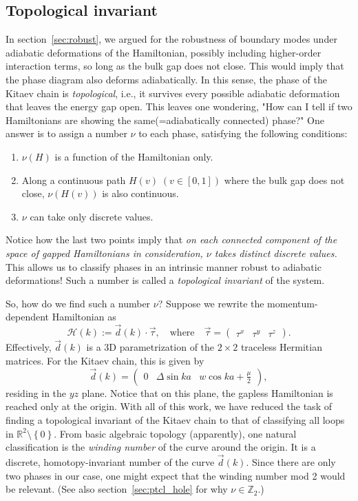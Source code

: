 \documentclass{article}
\begin{document}
\subsection{Topological invariant}\label{sec:invar}
In section~\ref{sec:robust}, we argued for the robustness of boundary modes under adiabatic deformations
of the Hamiltonian, possibly including higher-order interaction terms,
so long as the bulk gap does not close.
This would imply that the phase diagram also deforms adiabatically.
In this sense, the phase of the Kitaev chain is \emph{topological}, i.e., it survives
every possible adiabatic deformation that leaves the energy gap open.
This leaves one wondering,
"How can I tell if two Hamiltonians are showing the same(=adiabatically connected) phase?"
One answer is to assign a number $\nu$ to each phase, satisfying the following conditions:
\begin{enumerate}
    \item $\nu(H)$ is a function of the Hamiltonian only.
    \item Along a continuous path $H(v)\; (v\in[0,1])$ where the bulk gap does not close,
        $\nu(H(v))$ is also continuous.
    \item $\nu$ can take only discrete values.
\end{enumerate}
Notice how the last two points imply that \emph{on each connected component
of the space of gapped Hamiltonians in consideration,
$\nu$ takes distinct discrete values.}
This allows us to classify phases in an intrinsic manner robust to adiabatic deformations!
Such a number is called a \emph{topological invariant} of the system.

So, how do we find such a number $\nu$?
Suppose we rewrite the momentum-dependent Hamiltonian as
\[
    \mathcal{H}(k) := \vec{d}(k) \cdot \vec{\tau},\quad \text{where}\quad
    \vec{\tau} = \begin{pmatrix}
        \tau^x & \tau^y & \tau^z
    \end{pmatrix}.
\]
Effectively, $\vec{d}(k)$ is a 3D parametrization of the $2\times2$ traceless Hermitian matrices.
For the Kitaev chain, this is given by
\[
    \vec{d}(k) = \begin{pmatrix}
        0 & \Delta\sin ka & w\cos ka + \frac{\mu}{2}
    \end{pmatrix},
\]
residing in the $yz$ plane.
Notice that on this plane, the gapless Hamiltonian is reached only at the origin.
With all of this work, we have reduced the task of finding a topological invariant of the Kitaev chain
to that of classifying all loops in $\mathbb{R}^2 \setminus \left\{0\right\}$.
From basic algebraic topology (apparently), one natural classification is the \emph{winding number}
of the curve around the origin.
It is a discrete, homotopy-invariant number of the curve $\vec{d}(k)$.
Since there are only two phases in our case, one might expect that the winding number mod 2 would be relevant.
(See also section~\ref{sec:ptcl_hole} for why $\nu \in \mathbb{Z}_2$.)
\end{document}
